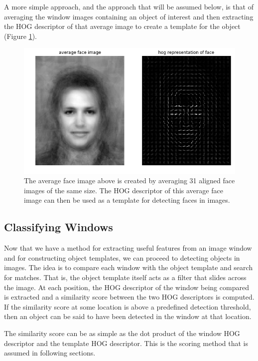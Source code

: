 \documentclass{article}
\begin{document}
A more simple approach, and the approach that will be assumed below, is that of averaging the window images containing an object of interest and then extracting the HOG descriptor of that average image to create a template for the object (Figure \ref{fig:face_template}).

\begin{figure}[h]
	\center
	\includegraphics[scale=0.5]{average_face_template.png}
	\caption{The average face image above is created by averaging 31 aligned face images of the same size. The HOG descriptor of this average face image can then be used as a template for detecting faces in images.}
    \label{fig:face_template}
\end{figure}


\subsection{Classifying Windows}
Now that we have a method for extracting useful features from an image window and for constructing object templates, we can proceed to detecting objects in images. The idea is to compare each window with the object template and search for matches. That is, the object template itself acts as a filter that slides across the image. At each position, the HOG descriptor of the window being compared is extracted and a similarity score between the two HOG descriptors is computed. If the similarity score at some location is above a predefined detection threshold, then an object can be said to have been detected in the window at that location.

The similarity score can be as simple as the dot product of the window HOG descriptor and the template HOG descriptor. This is the scoring method that is assumed in following sections.
\end{document}

